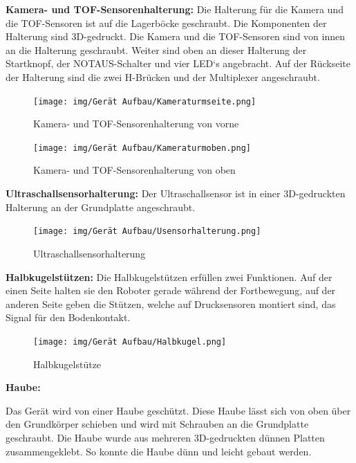 \newpage

\textbf{Kamera- und TOF-Sensorenhalterung:} Die Halterung für die Kamera und die TOF-Sensoren ist auf die Lagerböcke geschraubt. Die Komponenten der Halterung sind 3D-gedruckt. Die Kamera und die TOF-Sensoren sind von innen an die Halterung geschraubt. Weiter sind oben an dieser Halterung der Startknopf, der NOTAUS-Schalter und vier LED`s angebracht. Auf der Rückseite der Halterung sind die zwei H-Brücken und der Multiplexer angeschraubt.

\begin{figure}[H]
  \texttt{[image: img/Gerät Aufbau/Kameraturmseite.png]}
  \centering
  \caption{Kamera- und TOF-Sensorenhalterung von vorne}
  \label{fig:Kameraturnseite}
\end{figure}

\begin{figure}[H]
  \texttt{[image: img/Gerät Aufbau/Kameraturmoben.png]}
  \centering
  \caption{Kamera- und TOF-Sensorenhalterung von oben}
  \label{fig:Kameraturmoben}
\end{figure}

\newpage

\textbf{Ultraschallsensorhalterung:} Der Ultraschallsensor ist in einer 3D-gedruckten Halterung an der Grundplatte angeschraubt.

\begin{figure}[H]
  \texttt{[image: img/Gerät Aufbau/Usensorhalterung.png]}
  \centering
  \caption{Ultraschallsensorhalterung}
  \label{fig:Uschallsensorhalterung}
\end{figure}

\textbf{Halbkugelstützen:} Die Halbkugelstützen erfüllen zwei Funktionen. Auf der einen Seite halten sie den Roboter gerade während der Fortbewegung, auf der anderen Seite geben die Stützen, welche auf Drucksensoren montiert sind, das Signal für den Bodenkontakt.

\begin{figure}[H]
  \texttt{[image: img/Gerät Aufbau/Halbkugel.png]}
  \centering
  \caption{Halbkugelstütze}
  \label{fig:Halbkugelstütze}
\end{figure}

\newpage

\textbf{Haube:}

Das Gerät wird von einer Haube geschützt. Diese Haube lässt sich von oben über den Grundkörper schieben und wird mit Schrauben an die Grundplatte geschraubt. Die Haube wurde aus mehreren 3D-gedruckten dünnen Platten zusammengeklebt. So konnte die Haube dünn und leicht gebaut werden.

